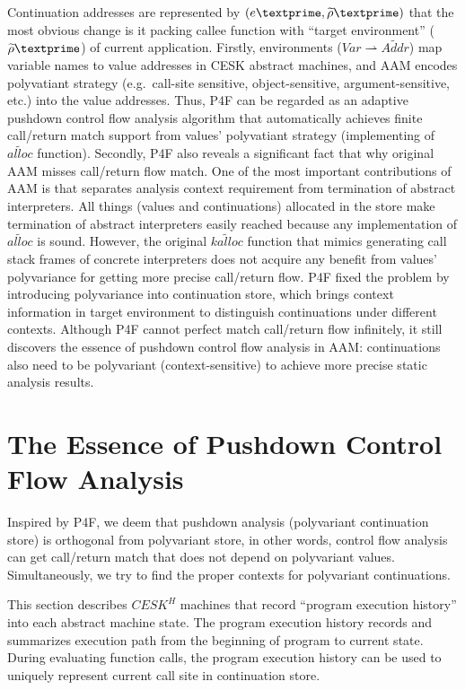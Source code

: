 \documentclass{article}
\begin{document}
Continuation addresses are represented by $(e\textprime, \widetilde{\rho}\textprime)$ that the most obvious change is it packing callee function  with ``target environment'' ($\widetilde{\rho}\textprime$) of current application.
Firstly, environments ($Var \rightharpoonup \widetilde{Addr}$) map variable names to value addresses in CESK abstract machines, and AAM encodes polyvatiant strategy (e.g.\ call-site sensitive, object-sensitive, argument-sensitive, etc.) into the value addresses. Thus, P4F can be regarded as an adaptive pushdown control flow analysis algorithm that automatically achieves finite call/return match support from values' polyvatiant strategy (implementing of $\widetilde{alloc}$ function).
Secondly, P4F also reveals a significant fact that why original AAM misses call/return flow match. One of the most important contributions of AAM is that separates analysis context requirement from termination of abstract interpreters. All things (values and continuations) allocated in the store make termination of abstract interpreters easily reached because any implementation of $\widetilde{alloc}$ is sound.
However, the original $\widetilde{kalloc}$ function that mimics generating call stack frames of concrete interpreters does not acquire any benefit from values' polyvariance for getting more precise call/return flow. P4F fixed the problem by introducing polyvariance into continuation store, which brings context information in target environment to distinguish continuations under different contexts. Although P4F cannot perfect match call/return flow infinitely, it still discovers the essence of pushdown control flow analysis in AAM\@: continuations also need to be polyvariant (context-sensitive) to achieve more precise static analysis results.

\section{The Essence of Pushdown Control Flow Analysis}
\label{sec:The Essence of Pushdown Control Flow Analysis}
Inspired by P4F, we deem that pushdown analysis (polyvariant continuation store) is orthogonal from polyvariant store, in other words, control flow analysis can get call/return match that does not depend on polyvariant values. Simultaneously, we try to find the proper contexts for polyvariant continuations.

This section describes $CESK^H$ machines that record ``program execution history'' into each abstract machine state.
The program execution history records and summarizes execution path from the beginning of program to current state.
During evaluating function calls, the program execution history can be used to uniquely represent current call site in continuation store.
\end{document}
